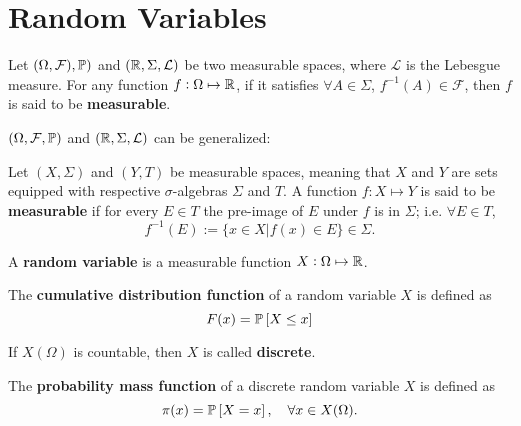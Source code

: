 \section{Random Variables}

\begin{definition}
    Let $(\Omega, \mathcal{F}), \mathbb{P})$ and $(\mathbb{R}, \Sigma, \mathcal{L})$ be two measurable spaces, where $\mathcal{L}$ is the Lebesgue measure. For any function $f: \Omega \mapsto \mathbb{R}$, if it satisfies $\forall A \in \Sigma$, $f^{-1}(A) \in \mathcal{F}$, then $f$ is said to be \textbf{measurable}.
\end{definition}

\begin{remark}
    $(\Omega, \mathcal{F}, \mathbb{P})$ and $(\mathbb{R}, \Sigma, \mathcal{L})$ can be generalized:

    \textcolor{myblue}{Let $(X, \Sigma)$ and $(Y, T)$ be measurable spaces, meaning that $X$ and $Y$ are sets equipped with respective $\sigma$-algebras $\Sigma$ and $T$. A function $f:X\mapsto Y$ is said to be \textbf{measurable} if for every $E \in T$ the pre-image of $E$ under $f$ is in $\Sigma$; i.e. $\forall E \in T$,
    \begin{equation*}
        f^{-1}(E) := \{ x \in X | f(x) \in E \} \in \Sigma.
    \end{equation*}}
\end{remark}

\begin{definition}
    A \textbf{random variable} is a measurable function $X: \Omega \mapsto \mathbb{R}$.
\end{definition}

\begin{definition}
    The \textbf{cumulative distribution function} of a random variable $X$ is defined as 
    \begin{equation*}
        F(x) = \mathbb{P} \left[ X \le x \right] 
    \end{equation*}
\end{definition}

\begin{definition}
    If $X(\Omega)$ is countable, then $X$ is called \textbf{discrete}.
\end{definition}

\begin{definition}
    The \textbf{probability mass function} of a discrete random variable $X$ is defined as 
    \begin{equation*}
        \pi(x) = \mathbb{P} \left[ X = x \right], \quad \forall x \in X(\Omega).
    \end{equation*}
\end{definition}

